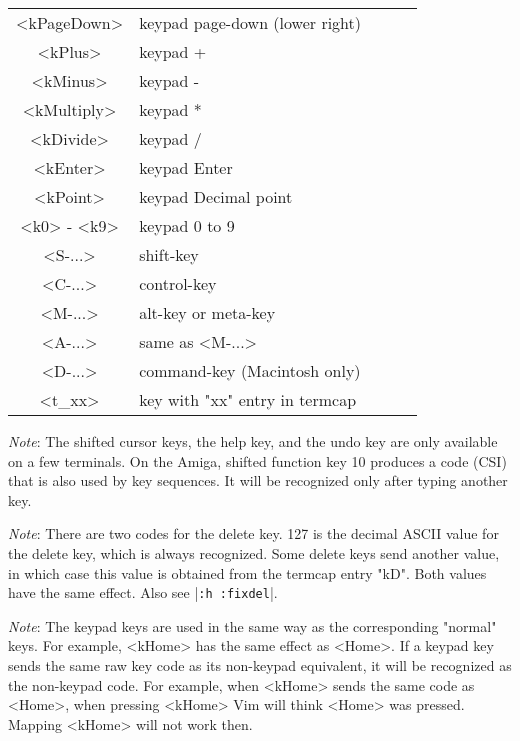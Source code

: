 \begin{description}
\begin{tabularx}{\textwidth}{|c|X|c|c|c|}
				<kPageDown>      & keypad page-down (lower right) &  &  & \label{keypad-page-down}\\
				<kPlus>          & keypad +                       &  &  & \label{keypad-plus}\\
				<kMinus>         & keypad -                       &  &  & \label{keypad-minus}\\
				<kMultiply>      & keypad *                       &  &  & \label{keypad-multiply}\\
				<kDivide>        & keypad /                       &  &  & \label{keypad-divide}\\
				<kEnter>         & keypad Enter                   &  &  & \label{keypad-enter}\\
				<kPoint>         & keypad Decimal point           &  &  & \label{keypad-point}\\
				<k0> - <k9>      & keypad 0 to 9                  &  &  & \label{keypad-0} \label{keypad-9}\\
				<S-...>          & shift-key                      &  &  & \label{shift} \label{<S-}\\
				<C-...>          & control-key                    &  &  & \label{control} \label{ctrl} \label{<C-}\\
				<M-...>          & alt-key or meta-key            &  &  & \label{meta} \label{alt} \label{<M-}\\
				<A-...>          & same as <M-...>                &  &  & \label{<A-}\\
				<D-...>          & command-key (Macintosh only)   &  &  & \label{<D-}\\
				<t\_xx>          & key with "xx" entry in termcap &  &  & \\
				\hline
\end{tabularx}

\textit{Note}: The shifted cursor keys, the help key, and the undo key are only available on a few terminals.
On the Amiga, shifted function key 10 produces a code (CSI) that is also used by key sequences.
It will be recognized only after typing another key.

\textit{Note}: There are two codes for the delete key.
127 is the decimal ASCII value for the delete key, which is always recognized.
Some delete keys send another value, in which case this value is obtained from the termcap entry "kD".
Both values have the same effect.
Also see |\verb!:h :fixdel!|.

\textit{Note}: The keypad keys are used in the same way as the corresponding "normal" keys.
For example, <kHome> has the same effect as <Home>.
If a keypad key sends the same raw key code as its non-keypad equivalent, it will be recognized as the non-keypad code.
For example, when <kHome> sends the same code as <Home>, when pressing <kHome> Vim will think <Home> was pressed.
Mapping <kHome> will not work then.


\end{description}
